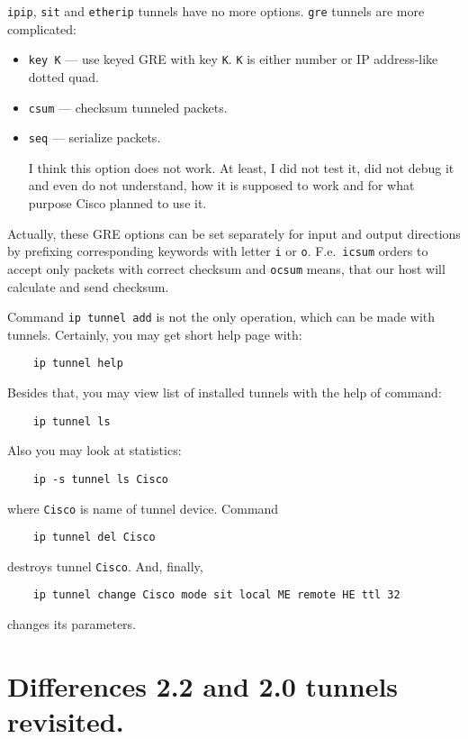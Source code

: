 \verb|ipip|, \verb|sit| and \verb|etherip| tunnels have no more options.
\verb|gre| tunnels are more complicated:

\begin{itemize}

\item \verb|key K| --- use keyed GRE with key \verb|K|. \verb|K| is
	either number or IP address-like dotted quad.

\item \verb|csum| --- checksum tunneled packets.

\item \verb|seq| --- serialize packets.
\begin{NB}
	I think this option does not
	work. At least, I did not test it, did not debug it and
	even do not understand,	how it is supposed to work and for what
	purpose Cisco planned to use it.
\end{NB}

\end{itemize}


Actually, these GRE options can be set separately for input and
output directions by prefixing corresponding keywords with letter
\verb|i| or \verb|o|. F.e.\ \verb|icsum| orders to accept only
packets with correct checksum and \verb|ocsum| means, that
our host will calculate and send checksum.

Command \verb|ip tunnel add| is not the only operation,
which can be made with tunnels. Certainly, you may get short help page
with:
\begin{verbatim}
    ip tunnel help
\end{verbatim}

Besides that, you may view list of installed tunnels with the help of command:
\begin{verbatim}
    ip tunnel ls
\end{verbatim}
Also you may look at statistics:
\begin{verbatim}
    ip -s tunnel ls Cisco
\end{verbatim}
where \verb|Cisco| is name of tunnel device. Command
\begin{verbatim}
    ip tunnel del Cisco
\end{verbatim}
destroys tunnel \verb|Cisco|. And, finally,
\begin{verbatim}
    ip tunnel change Cisco mode sit local ME remote HE ttl 32
\end{verbatim}
changes its parameters.

\section{Differences 2.2 and 2.0 tunnels revisited.}

